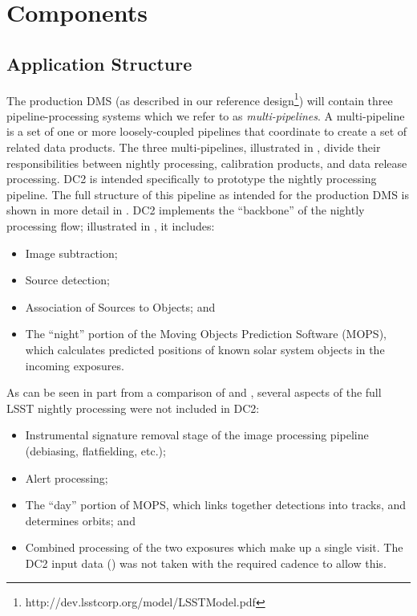 
\section{Components}\label{sComp}

\subsection{Application Structure}
The production DMS (as described in our reference 
design\footnote{http://dev.lsstcorp.org/model/LSSTModel.pdf}) will
contain three pipeline-processing systems which we refer to as
\textit{multi-pipelines}.  A multi-pipeline is a set of one or more
loosely-coupled pipelines that coordinate to create a set of related
data products.  The three multi-pipelines, illustrated in
, divide their responsibilities between nightly
processing, calibration products, and data release processing.  DC2 is
intended specifically to prototype the nightly processing pipeline.
The full structure of this pipeline as intended for the production DMS
is shown in more detail in .  DC2 implements
the ``backbone'' of the nightly processing flow; illustrated in
, it includes:

\begin{itemize}
\item Image subtraction;
\item Source detection;
\item Association of Sources to Objects; and
\item The ``night'' portion of the Moving Objects Prediction Software
  (MOPS), which calculates predicted positions of known solar system
  objects in the incoming exposures.
\end{itemize}

As can be seen in part from a comparison of  and
, several aspects of the full LSST nightly processing were
not included in DC2: 

\begin{itemize}
\item Instrumental signature removal stage of the image processing
  pipeline (debiasing, flatfielding, etc.);
\item Alert processing;
\item The ``day'' portion of MOPS, which links together detections
  into tracks, and determines orbits; and
\item Combined processing of the two exposures which make up a single
  visit. The DC2 input data () was not taken with the
  required cadence to allow this.
\end{itemize}

